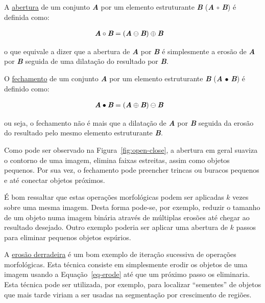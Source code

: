 A \underline{abertura} de um conjunto \textit{\textbf{A}} por um
elemento estruturante \textit{\textbf{B}} (\textit{\textbf{A}} $\circ$
\textit{\textbf{B}}) é definida como:

\begin{align}
 &\textit{\textbf{A}} \circ \textit{\textbf{B}} = \left(\textit{\textbf{A}} \ominus \textit{\textbf{B}} \right) \oplus \textit{\textbf{B}} 
\end{align}

o que equivale a dizer que a abertura de \textit{\textbf{A}} por
\textit{\textbf{B}} é simplesmente a erosão de \textit{\textbf{A}} por
\textit{\textbf{B}} seguida de uma dilatação do resultado por
\textit{\textbf{B}}.

O \underline{fechamento} de um conjunto \textit{\textbf{A}} por um
elemento estruturante \textit{\textbf{B}} (\textit{\textbf{A}}
$\bullet$ \textit{\textbf{B}}) é definido como:

\begin{align}
  &\textit{\textbf{A}} \bullet \textit{\textbf{B}} =
  \left(\textit{\textbf{A}} \oplus \textit{\textbf{B}} \right) \ominus
  \textit{\textbf{B}}
\end{align}

ou seja, o fechamento não é mais que a dilatação de
\textit{\textbf{A}} por \textit{\textbf{B}} seguida da erosão do
resultado pelo mesmo elemento estruturante \textit{\textbf{B}}.

Como pode ser observado na Figura~\ref{fig:open-close}, a abertura em
geral suaviza o contorno de uma imagem, elimina faixas estreitas,
assim como objetos pequenos. Por sua vez, o fechamento pode preencher
trincas ou buracos pequenos e até conectar objetos próximos.

É bom ressaltar que estas operações morfológicas podem ser aplicadas
$k$ vezes sobre uma mesma imagem. Desta forma pode-se, por exemplo,
reduzir o tamanho de um objeto numa imagem binária através de
múltiplas erosões até chegar ao resultado desejado. Outro exemplo
poderia ser aplicar uma abertura de $k$ passos para eliminar pequenos
objetos espúrios.

A \underline{erosão derradeira} é um bom exemplo de iteração sucessiva
de operações morfológicas. Esta técnica consiste em simplesmente
erodir os objetos de uma imagem usando a Equação~\ref{eq-erode} até
que um próximo passo os eliminaria. Esta técnica pode ser utilizada,
por exemplo, para localizar ``sementes'' de objetos que mais tarde
viriam a ser usadas na segmentação por crescimento de
regiões.\cite{65}

